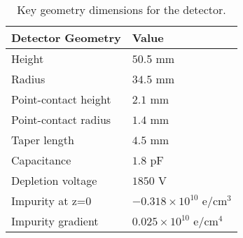 \begin{table}[htb]
\centering
\begin{tabular}{|l | l|}
\hline
Detector Geometry   & Value \\
\hline
Height      & $50$.5 mm  \\
Radius             & $34.5$ mm  \\
Point-contact height          & $2.1$ mm   \\
Point-contact radius         & $1.4$ mm   \\
Taper length               & $4.5$ mm   \\
Capacitance & $1.8$ pF \\
Depletion voltage & $1850$ V \\
Impurity at z=0 & $-0.318 \times 10^{10}$ $\mathrm{e}/\mathrm{cm^3}$\\
Impurity gradient & $0.025 \times 10^{10}$ $\mathrm{e}/\mathrm{cm^4}$\\
\hline
\end{tabular}
\caption{Key geometry dimensions for the {\ponama} detector.}
\label{ch5_5_tab_ponama1_geometry}
\end{table}

